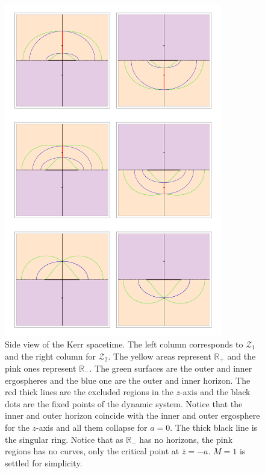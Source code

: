   \begin{figure}[htp!]    
\begin{center}
 \centerline{\includegraphics[width=0.85\textwidth]{img/Chapter3/Axis.png}}
 \end{center}
 \caption{Side view of the Kerr spacetime. The left column corresponds to $\mathcal{Z}_1$ and the right column for $\mathcal{Z}_2$. The yellow areas represent $\mathbb{R}_+$ and the pink ones represent $\mathbb{R}_-$. The green surfaces are the outer and inner ergospheres and the blue one are the outer and inner horizon. The red thick lines are the excluded regions in the $z$-axis and the black dots are the fixed points of the dynamic system. Notice that the inner and outer horizon coincide with the inner and outer ergosphere for the $z$-axis and all them collapse for $a=0$. The thick black line is the singular ring. Notice that as  $\mathbb{R}_-$ has no horizons, the pink regions has no curves, only the critical point at $\bar{z}=-a$. $M=1$ is settled for simplicity. }
 \label{fig:Axissurfaces}
\end{figure}  

